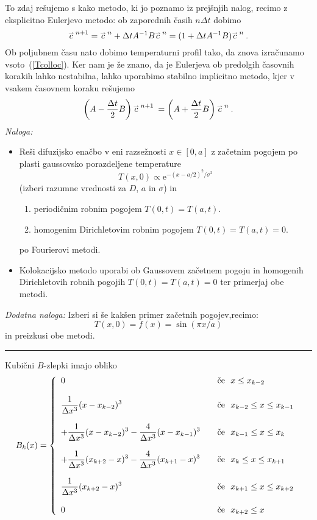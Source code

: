 \documentclass[slovene,11pt,a4paper]{article}
\renewcommand{\vec}[1]{\overset{\smash{\hbox{\raise -0.42ex\hbox{$\scriptscriptstyle\rightharpoonup$}}}}{#1}}
\begin{document}
To zdaj rešujemo s kako metodo, ki jo poznamo iz prejšnjih
nalog, recimo z eksplicitno Eulerjevo metodo: ob zaporednih
časih $n{\Delta t}$ dobimo
$$
\vec{c}^{\>n+1} = \vec{c}^{\>n} + {\Delta t}{ A}^{-1}{ B}\vec{c}^{\>n}
 = ( { 1} + {\Delta t}{ A}^{-1}{ B})\vec{c}^{\>n} \>.
$$
Ob poljubnem času nato dobimo temperaturni profil tako,
da znova izračunamo vsoto~(\ref{Tcolloc}).
Ker nam je že znano, da je Eulerjeva ob predolgih časovnih korakih
lahko nestabilna, lahko uporabimo stabilno implicitno metodo,
kjer v vsakem časovnem koraku rešujemo
$$
  \left( { A} - \frac{\Delta t}{2}{ B}\right)\vec{c}^{\>n+1} \>
 = \left( { A} + \frac{\Delta t}{2}{ B}\right)\vec{c}^{\>n} \>.
$$
\bigskip
{\sl Naloga:}
\begin{itemize}
  \item Reši difuzijsko enačbo v eni razsežnosti $x\in [0,a]$
z začetnim pogojem po plasti gaussovsko porazdeljene temperature
\begin{equation*}
  T(x,0) \propto \mathrm{e}^{-(x-a/2)^2 / \sigma^2}
\end{equation*}
(izberi razumne vrednosti za $D$, $a$ in $\sigma$)
in
\begin{enumerate}
 \item periodičnim robnim pogojem $T(0,t) = T(a,t)$.
 \item homogenim Dirichletovim robnim pogojem $T(0,t) = T(a,t)=0$.
\end{enumerate}
po Fourierovi metodi.
\item Kolokacijsko metodo uporabi ob Gaussovem začetnem pogoju
in homogenih Dirichletovih robnih pogojih $T(0,t)=T(a,t)=0$ ter primerjaj obe metodi.
\end{itemize}
{\sl Dodatna naloga:} Izberi si še kakšen primer začetnih pogojev,recimo:
$$
T(x,0) = f(x) = \sin (\pi x/a)
$$
 in preizkusi obe metodi.
\bigskip\bigskip


\hrule

\bigskip


\bigskip

\noindent Kubični $B$-zlepki imajo obliko
$$
B_k(x) = \left\{
\begin{array}{ll}
  0
    & \quad\text{če~~} x \le x_{k-2} \cr
    & \cr
  \displaystyle\frac{1}{\Delta x^3} (x - x_{k-2})^3
    & \quad\text{če~~} x_{k-2} \le x \le x_{k-1} \cr
    & \cr
 +\displaystyle\frac{1}{\Delta x^3} (x - x_{k-2})^3
 -\displaystyle\frac{4}{\Delta x^3} (x - x_{k-1})^3
    & \quad\text{če~~} x_{k-1} \le x \le x_{k} \cr
    & \cr
    +\displaystyle\frac{1}{\Delta x^3} (x_{k+2} - x)^3
    -\displaystyle\frac{4}{\Delta x^3} (x_{k+1} - x)^3
    & \quad\text{če~~} x_{k} \le x \le x_{k+1} \cr
    & \cr
    \displaystyle\frac{1}{\Delta x^3} (x_{k+2} - x)^3
    & \quad\text{če~~} x_{k+1} \le x \le x_{k+2} \cr
    & \cr
  0
    & \quad\text{če~~} x_{k+2} \le x
\end{array}\right. \>
$$
\end{document}
